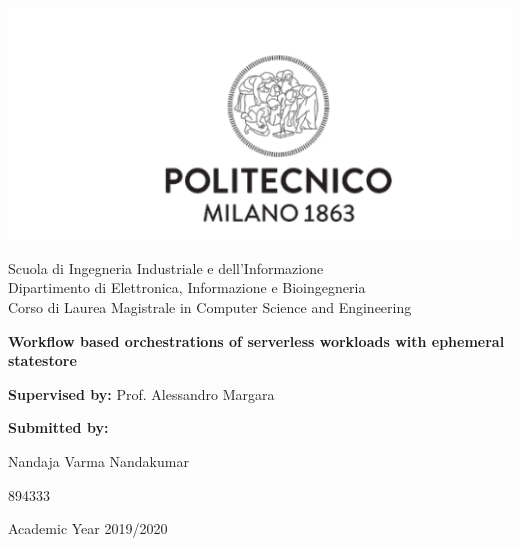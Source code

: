 \documentclass[12pt,titlepage]{article}
\date{\today}
\title{}
\begin{document}
\begin{titlepage}
   \begin{center}

       \includegraphics[width=1.0\textwidth]{./thesis_images/university.png}
            
       Scuola di Ingegneria Industriale e dell’Informazione\\
       Dipartimento di Elettronica, Informazione e Bioingegneria\\
       Corso di Laurea Magistrale in Computer Science and Engineering \\
       \date{\today}

            
            
       \vspace{2.8cm}
       \textbf{Workflow based orchestrations of serverless workloads with ephemeral statestore}

       \vspace{0.5cm}
            
       \vfill
       \vspace{1.5cm}

       \textbf{Supervised by:}
       Prof. Alessandro Margara

       \vspace{0.5cm}
       \textbf{Submitted by:}

       Nandaja Varma Nandakumar

       894333

       \vspace{1.0cm}
       Academic Year 2019/2020 

   \end{center}
\end{titlepage}
\end{document}
